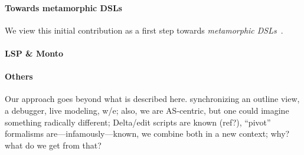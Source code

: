 \paragraph{Towards metamorphic DSLs}
We view this initial contribution as a first step towards \emph{metamorphic DSLs}~\cite{acher2014metamorphic}.

\paragraph{LSP \& Monto}
\textbf{}

\paragraph{Others}
Our approach goes beyond what is described here. \eg synchronizing an outline view, a debugger, live modeling, w/e; also, we are AS-centric, but one could imagine something radically different;
Delta/edit scripts are known (ref?), ``pivot'' formalisms are---infamously---known, we combine both in a new context; why? what do we get from that?
